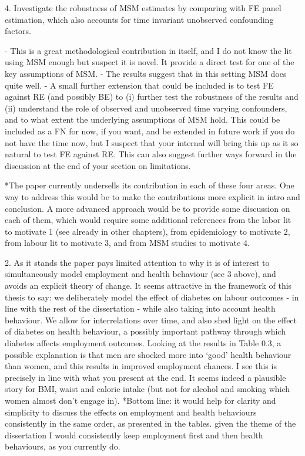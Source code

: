 4. Investigate the robustness of MSM estimates by comparing with FE panel estimation, which also accounts for time invariant unobserved confounding factors.
 
-          This is a great methodological contribution in itself, and I do not know the lit using MSM enough but suspect it is novel. It provide a direct test for one of the key assumptions of MSM.
-          The results suggest that in this setting MSM does quite well. 
-          A small further extension that could be included is to test FE against RE (and possibly BE) to (i) further test the robustness of the results and (ii) understand the role of observed and unobserved time varying confounders, and to what extent the underlying assumptions of MSM hold.  This could be included as a FN for now, if you want, and be extended in future work if you do not have the time now, but I suspect that your internal will bring this up as it so natural to test FE against RE. This can also suggest further ways forward in the discussion at the end of your section on limitations.
 
*The paper currently undersells its contribution in each of these four areas.  One way to address this would be to make the contributions more explicit in intro and conclusion. A more advanced approach would be to provide some discussion on each of them, which would require some additional references from the labor lit to motivate 1 (see already in other chapters), from epidemiology to motivate 2, from labour lit to motivate 3, and from MSM studies to motivate 4. 
 
2. As it stands the paper pays limited attention to why it is of interest to simultaneously model employment and health behaviour  (see 3 above), and avoids an explicit theory of change.  It seems attractive in the framework of this thesis to say: we deliberately model the effect of diabetes on labour outcomes - in line with the rest of the dissertation - while also taking into account health behaviour. We allow for interrelations over time, and also shed light on the effect of diabetes on health behaviour, a possibly important pathway through which diabetes affects employment outcomes.  Looking at the results in Table 0.3, a possible explanation is that men are shocked more into ‘good’ health behaviour than women, and this results in improved employment chances.  I see this is precisely in line with what you present at the end. It seems indeed a plausible story for BMI, waist and calorie intake (but not for alcohol and smoking which women almost don’t engage in).
*Bottom line: it would help for clarity and simplicity to discuss the effects on employment and health behaviours consistently in the same order, as presented in the tables. given the theme of the dissertation I would consistently keep employment first and then health behaviours, as you currently do.  

